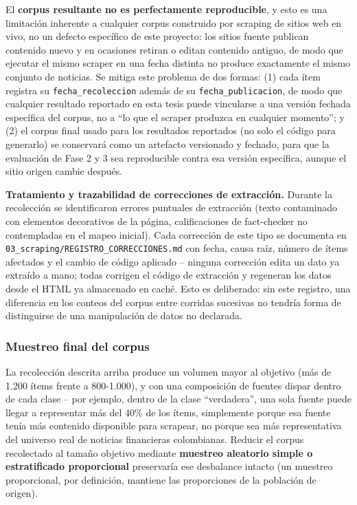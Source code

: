 El \textbf{corpus resultante no es perfectamente reproducible}, y esto es una limitación inherente a cualquier corpus construido por scraping de sitios web en vivo, no un defecto específico de este proyecto: los sitios fuente publican contenido nuevo y en ocasiones retiran o editan contenido antiguo, de modo que ejecutar el mismo scraper en una fecha distinta no produce exactamente el mismo conjunto de noticias. Se mitiga este problema de dos formas: (1) cada ítem registra su \texttt{fecha\_recoleccion} además de su \texttt{fecha\_publicacion}, de modo que cualquier resultado reportado en esta tesis puede vincularse a una versión fechada específica del corpus, no a ``lo que el scraper produzca en cualquier momento''; y (2) el corpus final usado para los resultados reportados (no solo el código para generarlo) se conservará como un artefacto versionado y fechado, para que la evaluación de Fase 2 y 3 sea reproducible contra esa versión específica, aunque el sitio origen cambie después.

\textbf{Tratamiento y trazabilidad de correcciones de extracción.} Durante la recolección se identificaron errores puntuales de extracción (texto contaminado con elementos decorativos de la página, calificaciones de fact-checker no contempladas en el mapeo inicial). Cada corrección de este tipo se documenta en \texttt{03\_scraping/REGISTRO\_CORRECCIONES.md} con fecha, causa raíz, número de ítems afectados y el cambio de código aplicado -- ninguna corrección edita un dato ya extraído a mano; todas corrigen el código de extracción y regeneran los datos desde el HTML ya almacenado en caché. Esto es deliberado: sin este registro, una diferencia en los conteos del corpus entre corridas sucesivas no tendría forma de distinguirse de una manipulación de datos no declarada.

\subsubsection{Muestreo final del corpus}

La recolección descrita arriba produce un volumen mayor al objetivo (más de 1.200 ítems frente a 800-1.000), y con una composición de fuentes dispar dentro de cada clase -- por ejemplo, dentro de la clase ``verdadera'', una sola fuente puede llegar a representar más del 40\% de los ítems, simplemente porque esa fuente tenía más contenido disponible para scrapear, no porque sea más representativa del universo real de noticias financieras colombianas. Reducir el corpus recolectado al tamaño objetivo mediante \textbf{muestreo aleatorio simple o estratificado proporcional} preservaría ese desbalance intacto (un muestreo proporcional, por definición, mantiene las proporciones de la población de origen).

